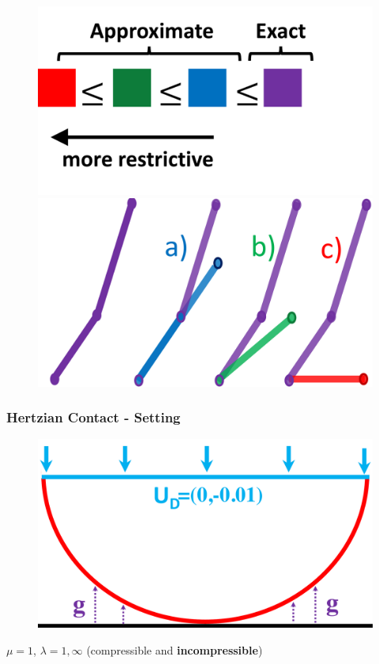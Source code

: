 \documentclass[8pt, oneside]{beamer}   	%
\newcommand{\titlecolor}[1]{\frametitle{\textcolor{dkgrey}{ \textbf{#1}}}}
\begin{document}
\begin{frame}
\begin{itemize}
{\begin{figure}[htbp!]
\includegraphics[scale=0.11]{img/coarseconstraintexactapprox.pdf}
		\includegraphics[scale=0.11]{img/coarseconstraintabc.pdf}
\end{figure}
}
\end{itemize}
\end{frame}




\begin{frame}
\titlecolor{Hertzian Contact - Setting}
\begin{figure}[htbp!]
\includegraphics[scale=0.2]{img/signorinicircle.pdf} 
\end{figure}
$ \mu = 1$, $ \lambda = 1, \infty$ (compressible and \textbf{incompressible})
\end{frame}
\end{document}
